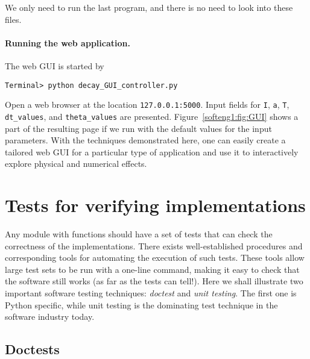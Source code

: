 \documentclass[graybox,sectrefs,envcountresetchap,open=right,final]{svmonodo}
\begin{document}
\noindent
We only need to run the last program, and there is no need to look into
these files.

\paragraph{Running the web application.}
The web GUI is started by



\begin{Verbatim}[frame=lines,label=\fbox{{\tiny Terminal}},framesep=2.5mm,framerule=0.7pt,fontsize=\fontsize{9pt}{9pt}]
Terminal> python decay_GUI_controller.py

\end{Verbatim}

Open a web browser at the location \texttt{127.0.0.1:5000}. Input fields for
\texttt{I}, \texttt{a}, \texttt{T}, \Verb!dt_values!, and \Verb!theta_values! are presented.  Figure~\ref{softeng1:fig:GUI} shows a part of the resulting page if we run
with the default values for the input parameters.
With the techniques demonstrated here, one can
easily create a tailored web GUI for a particular type of application
and use it to interactively explore physical and numerical effects.

\section{Tests for verifying implementations}
\label{softeng1:verify}

Any module with functions should have a set of tests that can
check the
correctness of the implementations.
There exists
well-established procedures and corresponding tools for automating
the execution of such tests. These tools allow large test sets to be
run with a one-line command, making it easy to check that the
software still works (as far as the
tests can tell!). Here we shall illustrate two important
software testing techniques: \emph{doctest} and \emph{unit testing}.
The first one is Python specific, while unit testing is the dominating
test technique in the software industry today.

\subsection{Doctests}
\label{softeng1:verify:doctests}

\end{document}

